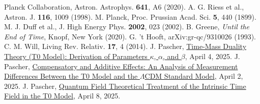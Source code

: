 \documentclass[12pt,a4paper]{article}
\begin{document}
\begin{thebibliography}{99}
		 Planck Collaboration, Astron. Astrophys. \textbf{641}, A6 (2020).
		 A. G. Riess et al., Astron. J. \textbf{116}, 1009 (1998).
		 M. Planck, Proc. Prussian Acad. Sci. \textbf{5}, 440 (1899).
		 M. J. Duff et al., J. High Energy Phys. \textbf{2002}, 023 (2002).
		 B. Greene, \textit{Until the End of Time}, Knopf, New York (2020).
		 G. 't Hooft, arXiv:gr-qc/9310026 (1993).
		 C. M. Will, Living Rev. Relativ. \textbf{17}, 4 (2014).
		 J. Pascher, \href{https://github.com/jpascher/T0-Time-Mass-Duality/tree/main/2/pdf/English/Zeit-Masse-Dualit\%C3\%A4tstheorie (T0-Modell) Herleitung der Parameter kappa, alpha und beta_en.pdf}{Time-Mass Duality Theory (T0 Model): Derivation of Parameters \(\kappa\), \(\alpha\), and \(\beta\)}, April 4, 2025.
		 J. Pascher, \href{https://github.com/jpascher/T0-Time-Mass-Duality/tree/main/2/pdf/English/Analyse der Messdifferenzen zwischen dem T0-Modell und dem Standardmodell_en.pdf}{Compensatory and Additive Effects: An Analysis of Measurement Differences Between the T0 Model and the \(\Lambda\)CDM Standard Model}, April 2, 2025.
				 J. Pascher, \href{https://github.com/jpascher/T0-Time-Mass-Duality/tree/main/2/pdf/English/Quantenfeldtheoretische Behandlung des intrinsischen Zeitfelds im T0-Modell_en.pdf}{Quantum Field Theoretical Treatment of the Intrinsic Time Field in the T0 Model}, April 8, 2025.
	\end{thebibliography}
	
\end{document}
